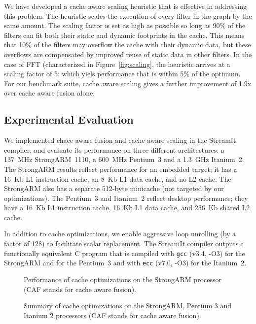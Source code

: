 We have developed a cache aware scaling heuristic that is effective in
addressing this problem.  The heuristic scales the execution of every
filter in the graph by the same amount.  The scaling factor is set as
high as possible so long as 90\% of the filters can fit both their
static and dynamic footprints in the cache.  This means that 10\% of
the filters may overflow the cache with their dynamic data, but these
overflows are compensated by improved reuse of static data in other
filters.  In the case of FFT (characterized in
Figure~\ref{fig:scaling}, the heuristic arrives at a scaling factor of
5, which yiels performance that is within 5\% of the optimum.  For our
benchmark suite, cache aware scaling gives a further improvement of
1.9x over cache aware fusion alone.

\subsection*{Experimental Evaluation}

We implemented chace aware fusion and cache aware scaling in the
StreamIt compiler, and evaluate its performance on three different
architectures: a 137~MHz StrongARM~1110, a 600~MHz Pentium~3 and a
1.3~GHz Itanium~2. The StrongARM results reflect performance for an
embedded target; it has a 16~Kb L1 instruction cache, an 8~Kb L1 data
cache, and no L2 cache.  The StrongARM also has a separate 512-byte
minicache (not targeted by our optimizations).  The Pentium~3 and
Itanium~2 reflect desktop performance; they have a 16~Kb L1
instruction cache, 16~Kb L1 data cache, and 256~Kb shared L2 cache.

In addition to cache optimizations, we enable aggressive loop
unrolling (by a factor of 128) to facilitate scalar replacement.  The
StreamIt compiler outputs a functionally equivalent C program that is
compiled with \texttt{gcc} (v3.4, -O3) for the StrongARM and for the
Pentium~3 and with \texttt{ecc} (v7.0, -O3) for the Itanium~2.

\begin{figure}[t]
\centering
{}
\caption[Performance of cache optimizations on the StrongARM]{Performance 
of cache optimizations on the StrongARM processor (CAF stands for
cache aware fusion).\protect\label{fig:arm}}
\end{figure}

\begin{figure}[t]
\centering
{}
\caption[Summary of cache optimizations on the StrongARM, Pentium 3 and 
Itanium 2]{Summary of cache optimizations on the StrongARM, Pentium 3
and Itanium 2 processors (CAF stands for cache aware
fusion).\protect\label{fig:p3}}
\end{figure}

